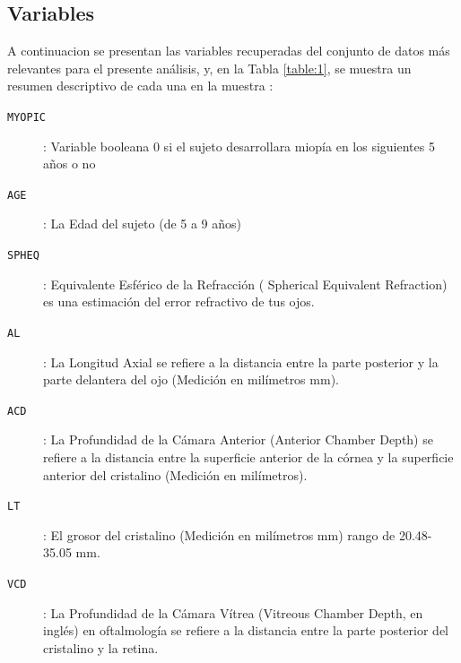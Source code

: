\documentclass[a4paper,10pt,twocolumn]{article}
\begin{document}
  \subsection{Variables}\label{sub:variables}
  	  A continuacion se presentan las variables recuperadas del conjunto de datos más relevantes para el presente análisis, y, en la Tabla \ref{table:1}, se muestra un resumen descriptivo de cada una en la muestra :
  	\begin{description}
  
  	\item [\texttt{MYOPIC}]: Variable booleana 0 si el sujeto desarrollara miopía en los siguientes 5 años o no
  	\item [\texttt{AGE}]: La Edad del sujeto (de 5 a 9 años)
  	\item [\texttt{SPHEQ}]: Equivalente Esférico de la Refracción ( Spherical Equivalent Refraction) es una estimación del error refractivo de tus ojos.
  	\item [\texttt{AL}]: La Longitud Axial se refiere a la distancia entre la parte posterior y la parte delantera del ojo   (Medición en milímetros mm).
  	\item [\texttt{ACD}]: La Profundidad de la Cámara Anterior (Anterior Chamber Depth) se refiere a la distancia entre la superficie anterior de la córnea y la superficie anterior del cristalino (Medición en milímetros).
  	\item [\texttt{LT}]: El grosor del cristalino (Medición en milímetros mm) rango de 20.48-35.05 mm.
  	\item [\texttt{VCD}]: La Profundidad de la Cámara Vítrea (Vitreous Chamber Depth, en inglés) en oftalmología se refiere a la distancia entre la parte posterior del cristalino y la retina.

\end{description}
\end{document}
